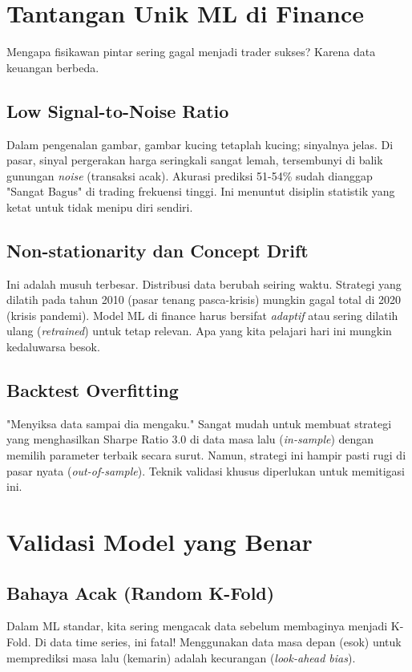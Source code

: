 \documentclass[12pt,a4paper]{book}
\begin{document}
\section{Tantangan Unik ML di Finance}
Mengapa fisikawan pintar sering gagal menjadi trader sukses? Karena data keuangan berbeda.

\subsection{Low Signal-to-Noise Ratio}
Dalam pengenalan gambar, gambar kucing tetaplah kucing; sinyalnya jelas. Di pasar, sinyal pergerakan harga seringkali sangat lemah, tersembunyi di balik gunungan \textit{noise} (transaksi acak). Akurasi prediksi 51-54\% sudah dianggap "Sangat Bagus" di trading frekuensi tinggi. Ini menuntut disiplin statistik yang ketat untuk tidak menipu diri sendiri.

\subsection{Non-stationarity dan Concept Drift}
Ini adalah musuh terbesar. Distribusi data berubah seiring waktu. Strategi yang dilatih pada tahun 2010 (pasar tenang pasca-krisis) mungkin gagal total di 2020 (krisis pandemi). Model ML di finance harus bersifat \textit{adaptif} atau sering dilatih ulang (\textit{retrained}) untuk tetap relevan. Apa yang kita pelajari hari ini mungkin kedaluwarsa besok.

\subsection{Backtest Overfitting}
"Menyiksa data sampai dia mengaku." Sangat mudah untuk membuat strategi yang menghasilkan Sharpe Ratio 3.0 di data masa lalu (\textit{in-sample}) dengan memilih parameter terbaik secara surut. Namun, strategi ini hampir pasti rugi di pasar nyata (\textit{out-of-sample}). Teknik validasi khusus diperlukan untuk memitigasi ini.

\section{Validasi Model yang Benar}
\subsection{Bahaya Acak (Random K-Fold)}
Dalam ML standar, kita sering mengacak data sebelum membaginya menjadi K-Fold. Di data time series, ini fatal! Menggunakan data masa depan (esok) untuk memprediksi masa lalu (kemarin) adalah kecurangan (\textit{look-ahead bias}).
\end{document}
